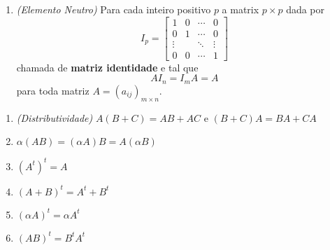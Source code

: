 \documentclass{beamer}
\begin{document}
  \begin{frame}
    \begin{teorema}
      \begin{enumerate}[label={\arabic*)}]
        \conti

        \item \textit{(Elemento Neutro)} Para cada inteiro positivo $p$ a matrix $p \times p$ dada por
          \[
            I_p = \begin{bmatrix}
              1 & 0 & \cdots & 0\\
              0 & 1 & \cdots & 0\\
              \vdots & & \ddots & \vdots\\
              0 & 0 & \cdots & 1
            \end{bmatrix}
          \]
        chamada de \textbf{matriz identidade} e tal que
        \[
          AI_n = I_mA = A
        \]
        para toda matriz $A = (a_{ij})_{m \times n}$.
      \seti
      \end{enumerate}
    \end{teorema}
  \end{frame}

  \begin{frame}
    \begin{teorema}
      \begin{enumerate}[label={\arabic*)}]
        \conti

        \item \textit{(Distributividade)} $A(B + C) = AB + AC$ e $(B + C)A = BA + CA$

        \item $\alpha(AB) = (\alpha A)B = A(\alpha B)$

        \item $(A^t)^t = A$

        \item $(A + B)^t = A^t + B^t$

        \item $(\alpha A)^t = \alpha A^t$

        \item $(AB)^t = B^tA^t$
      \end{enumerate}
    \end{teorema} 
  \end{frame}
\end{document}
